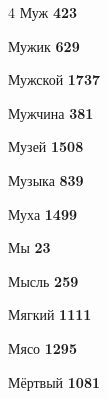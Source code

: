\begin{multicols}{4}
\noindent Муж \dotfill \textbf{\color{secondary} 423}\par
\noindent Мужик \dotfill \textbf{\color{secondary} 629}\par
\noindent Мужской \dotfill \textbf{\color{secondary} 1737}\par
\noindent Мужчина \dotfill \textbf{\color{secondary} 381}\par
\noindent Музей \dotfill \textbf{\color{secondary} 1508}\par
\noindent Музыка \dotfill \textbf{\color{secondary} 839}\par
\noindent Муха \dotfill \textbf{\color{secondary} 1499}\par
\noindent Мы \dotfill \textbf{\color{secondary} 23}\par
\noindent Мысль \dotfill \textbf{\color{secondary} 259}\par
\noindent Мягкий \dotfill \textbf{\color{secondary} 1111}\par
\noindent Мясо \dotfill \textbf{\color{secondary} 1295}\par
\noindent Мёртвый \dotfill \textbf{\color{secondary} 1081}\par


\end{multicols}
